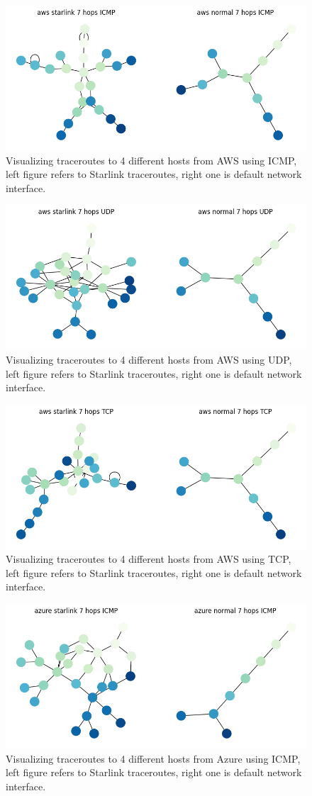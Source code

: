 \documentclass[IN,11pt,twoside,openright,bachelor,english]{tumthesis}
\begin{document}
\begin{figure}
	\label{fig:tr_aws_icmp}
	\centering
	\includegraphics[width=0.6\columnwidth]{img/tr_aws_icmp.png}
	\caption{Visualizing traceroutes to 4 different hosts from AWS using ICMP, left figure refers to Starlink traceroutes, right one is default network interface.}
\end{figure}


\begin{figure}
	\label{fig:tr_aws_udp}
	\centering
	\includegraphics[width=0.6\columnwidth]{img/tr_aws_udp.png}
	\caption{Visualizing traceroutes to 4 different hosts from AWS using UDP, left figure refers to Starlink traceroutes, right one is default network interface.}
\end{figure}

\begin{figure}
	\label{fig:tr_aws_tcp}
	\centering
	\includegraphics[width=0.6\columnwidth]{img/tr_aws_tcp.png}
	\caption{Visualizing traceroutes to 4 different hosts from AWS using TCP, left figure refers to Starlink traceroutes, right one is default network interface.}
\end{figure}

\begin{figure}
	\label{fig:tr_azure_icmp}
	\centering
	\includegraphics[width=0.6\columnwidth]{img/tr_azure_icmp.png}
	\caption{Visualizing traceroutes to 4 different hosts from Azure using ICMP, left figure refers to Starlink traceroutes, right one is default network interface.}
\end{figure}
\end{document}
